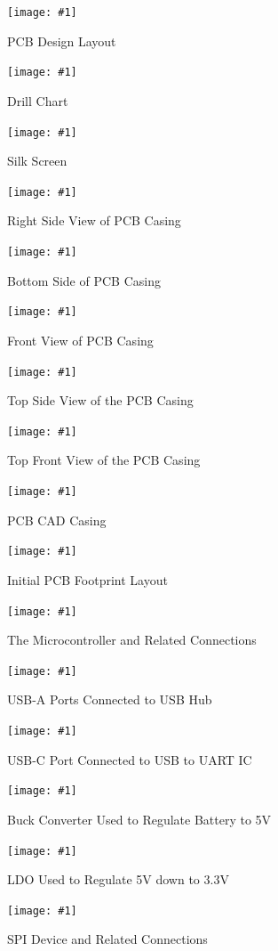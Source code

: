 \documentclass[12pt]{article}
\newcommand{\quickfigure}[4]{%
\begin{figure}[!htbp]
\centering
\texttt{[image: \#1]}
\caption{#3}
\label{#4}
\end{figure}%
}
\begin{document}

\quickfigure{images/PCB-design-layout.png}{15cm}{PCB Design Layout}{pcb-design-layout}

\quickfigure{images/drill-chart.png}{15cm}{Drill Chart}{drill-chart}

\quickfigure{images/silk-screen.png}{15cm}{Silk Screen}{silk-screen}

\quickfigure{images/right-side-of-PCB-casing.png}{15cm}{Right Side View of PCB Casing}{right-side-view-pcb-casing}

\quickfigure{images/bottom-side-of-PCB-casing.png}{15cm}{Bottom Side of PCB Casing}{bottom-side-pcb-casing}

\quickfigure{images/front-view-of-PCB-casing.png}{15cm}{Front View of PCB Casing}{front-view-pcb-casing}

\quickfigure{images/top-view-PCB-casing-open.png}{15cm}{Top Side View of the PCB Casing}{top-side-view-pcb-casing}

\quickfigure{images/top-front-view-PCB-casing-open.png}{15cm}{Top Front View of the PCB Casing}{top-front-view-pcb-casing}

\quickfigure{images/PCB-CAD-drawing.png}{15cm}{PCB CAD Casing}{pcb-cad-casing}

\quickfigure{images/initial-PCB-footprint-layout.png}{15cm}{Initial PCB Footprint Layout}{initial-pcb-footprint-layout}

\quickfigure{images/schematic/microcontroller.png}{15cm}{The Microcontroller and Related Connections}{microcontroller}
\quickfigure{images/schematic/USBA.png}{15cm}{USB-A Ports Connected to USB Hub}{usb-a}
\quickfigure{images/schematic/USBC.png}{15cm}{USB-C Port Connected to USB to UART IC}{usb-c}
\quickfigure{images/schematic/buck.png}{15cm}{Buck Converter Used to Regulate Battery to 5V}{buck}
\quickfigure{images/schematic/ldo.png}{15cm}{LDO Used to Regulate 5V down to 3.3V}{ldo}
\quickfigure{images/schematic/spi.png}{15cm}{SPI Device and Related Connections}{spi}
\end{document}

